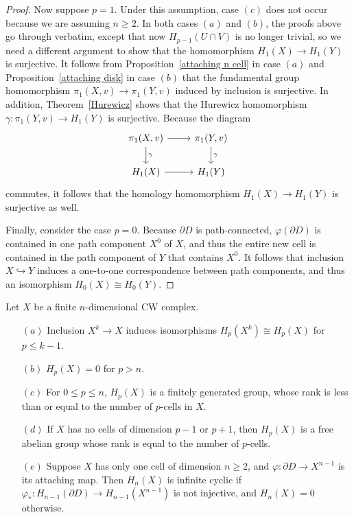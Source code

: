 \begin{proof}
Now suppose $p=1$. Under this assumption, case $(c)$ does not occur because we are assuming $n\geq 2$. In both cases $(a)$ and $(b)$, the proofs above go through verbatim, except that now $H_{p-1}(U\cap V)$ is no longer trivial, so we need a different argument
to show that the homomorphism $H_1(X)\to H_1(Y)$ is surjective. It follows from Proposition~\ref{attaching n cell} in case $(a)$ and Proposition~\ref{attaching disk} in case $(b)$ that the fundamental group homomorphism $\pi_1(X,v)\to\pi_1(Y,v)$ induced by inclusion is surjective. In addition, Theorem~\ref{Hurewicz} shows that the Hurewicz homomorphism $\gamma:\pi_1(Y,v)\to H_1(Y)$ is surjective. Because the diagram
\[\begin{tikzcd}
\pi_1(X,v)\ar[d,"\gamma"]\ar[r]&\pi_1(Y,v)\ar[d,"\gamma"]\\
H_1(X)\ar[r]&H_1(Y)
\end{tikzcd}\]
commutes, it follows that the homology homomorphism $H_1(X)\to H_1(Y)$ is surjective as well.\par
Finally, consider the case $p=0$. Because $\partial D$ is path-connected, $\varphi(\partial D)$ is contained
in one path component $X^0$ of $X$, and thus the entire new cell is contained in the path component of $Y$ that contains $X^0$. It follows that inclusion $X\hookrightarrow Y$ induces a one-to-one correspondence between path components, and thus an isomorphism $H_0(X)\cong H_0(Y)$.
\end{proof}
\begin{theorem}\label{homology CW prop}
Let $X$ be a finite $n$-dimensional CW complex.
\begin{itemize}
\item[$(a)$]Inclusion $X^k\to X$ induces isomorphisms $H_p(X^k)\cong H_p(X)$ for $p\leq k-1$.
\item[$(b)$]$H_p(X)=0$ for $p>n$.
\item[$(c)$]For $0\leq p\leq n$, $H_p(X)$ is a finitely generated group, whose rank is less than or
equal to the number of $p$-cells in $X$.
\item[$(d)$]If $X$ has no cells of dimension $p-1$ or $p+1$, then $H_p(X)$ is a free abelian group whose rank is equal to the number of $p$-cells.
\item[$(e)$]Suppose $X$ has only one cell of dimension $n\geq 2$, and $\varphi:\partial D\to X^{n-1}$ is its attaching map. Then $H_n(X)$ is infinite cyclic if $\varphi_*:H_{n-1}(\partial D)\to H_{n-1}(X^{n-1})$ is
not injective, and $H_n(X)=0$ otherwise.
\end{itemize}
\end{theorem}
